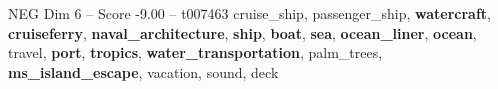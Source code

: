 \begin{textsample}{NEG Dim 6 – Score -9.00 – t007463}  \label{ex:f6_neg_013}
cruise\_ship, passenger\_ship, \textbf{watercraft}, \textbf{cruiseferry}, \textbf{naval\_architecture}, \textbf{ship}, \textbf{boat}, \textbf{sea}, \textbf{ocean\_liner}, \textbf{ocean}, travel, \textbf{port}, \textbf{tropics}, \textbf{water\_transportation}, palm\_trees, \textbf{ms\_island\_escape}, vacation, sound, deck

\end{textsample}
